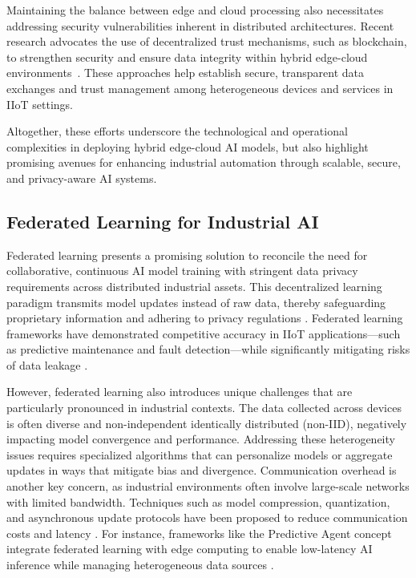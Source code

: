 \documentclass[sigconf]{acmart}
\begin{document}
Maintaining the balance between edge and cloud processing also necessitates addressing security vulnerabilities inherent in distributed architectures. Recent research advocates the use of decentralized trust mechanisms, such as blockchain, to strengthen security and ensure data integrity within hybrid edge-cloud environments~\cite{ref31}. These approaches help establish secure, transparent data exchanges and trust management among heterogeneous devices and services in IIoT settings.

Altogether, these efforts underscore the technological and operational complexities in deploying hybrid edge-cloud AI models, but also highlight promising avenues for enhancing industrial automation through scalable, secure, and privacy-aware AI systems.

\subsection{Federated Learning for Industrial AI}

Federated learning presents a promising solution to reconcile the need for collaborative, continuous AI model training with stringent data privacy requirements across distributed industrial assets. This decentralized learning paradigm transmits model updates instead of raw data, thereby safeguarding proprietary information and adhering to privacy regulations \cite{ref32}. Federated learning frameworks have demonstrated competitive accuracy in IIoT applications—such as predictive maintenance and fault detection—while significantly mitigating risks of data leakage \cite{ref34}.

However, federated learning also introduces unique challenges that are particularly pronounced in industrial contexts. The data collected across devices is often diverse and non-independent identically distributed (non-IID), negatively impacting model convergence and performance. Addressing these heterogeneity issues requires specialized algorithms that can personalize models or aggregate updates in ways that mitigate bias and divergence. Communication overhead is another key concern, as industrial environments often involve large-scale networks with limited bandwidth. Techniques such as model compression, quantization, and asynchronous update protocols have been proposed to reduce communication costs and latency \cite{ref36}. For instance, frameworks like the Predictive Agent concept integrate federated learning with edge computing to enable low-latency AI inference while managing heterogeneous data sources \cite{ref37}.
\end{document}
